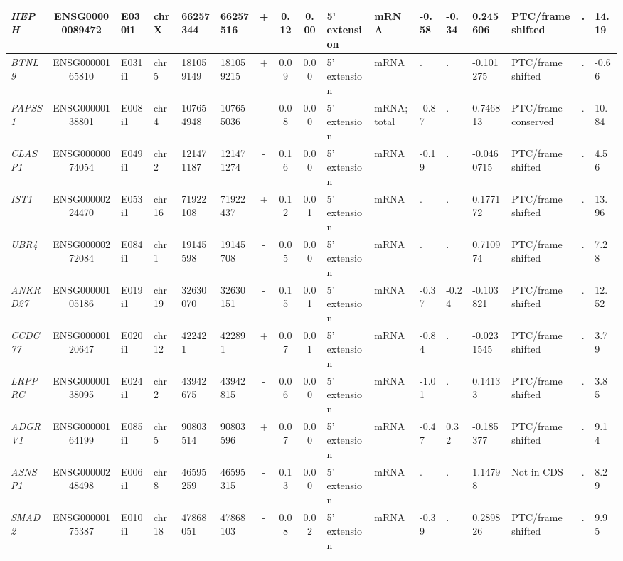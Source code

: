 \begin{appendices}
\begin{landscape}
\begin{table}
{\begin{tabular}{|l|c|l|l|l|l|c|c|c|l|l|l|l|l|l|l|l|}
		\textit{HEPH} & ENSG00000089472 & E030i1 & chrX  & 66257344 & 66257516 & +     & 0.12  & 0.00  & 5' extension & mRNA  & -0.58 & -0.34 & 0.245606 & PTC/frame shifted & . &  14.19 \\ \hline
		\textit{BTNL9} & ENSG00000165810 & E031i1 & chr5  & 181059149 & 181059215 & +     & 0.09  & 0.00  & 5' extension & mRNA  & . & . & -0.101275 & PTC/frame shifted & . &  -0.66 \\ \hline
		\textit{PAPSS1} & ENSG00000138801 & E008i1 & chr4  & 107654948 & 107655036 & -     & 0.08  & 0.00  & 5' extension & mRNA;total & -0.87 & . & 0.746813 & PTC/frame conserved & . &  10.84 \\ \hline
		\textit{CLASP1} & ENSG00000074054 & E049i1 & chr2  & 121471187 & 121471274 & -     & 0.16  & 0.00  & 5' extension & mRNA  & -0.19 & . & -0.0460715 & PTC/frame shifted & . &  4.56 \\ \hline
		\textit{IST1} & ENSG00000224470 & E053i1 & chr16 & 71922108 & 71922437 & +     & 0.12  & 0.01  & 5' extension & mRNA  & . & . & 0.177172 & PTC/frame shifted & . &  13.96 \\ \hline
		\textit{UBR4} & ENSG00000272084& E084i1 & chr1  & 19145598 & 19145708 & -     & 0.05  & 0.00  & 5' extension & mRNA  & . & . & 0.710974 & PTC/frame shifted & . &  7.28 \\ \hline
		\textit{ANKRD27} & ENSG00000105186 & E019i1 & chr19 & 32630070 & 32630151 & -     & 0.15  & 0.01  & 5' extension & mRNA  & -0.37 & -0.24 & -0.103821 & PTC/frame shifted & . &  12.52 \\ \hline
		\textit{CCDC77} & ENSG00000120647 & E020i1 & chr12 & 422421 & 422891 & +     & 0.07  & 0.01  & 5' extension & mRNA  & -0.84 & . & -0.0231545 & PTC/frame shifted & . &  3.79 \\ \hline
		\textit{LRPPRC} & ENSG00000138095 & E024i1 & chr2  & 43942675 & 43942815 & -     & 0.06  & 0.00  & 5' extension & mRNA  & -1.01 & . & 0.14133 & PTC/frame shifted & . &  3.85 \\ \hline
		\textit{ADGRV1} & ENSG00000164199 & E085i1 & chr5  & 90803514 & 90803596 & +     & 0.07  & 0.00  & 5' extension & mRNA  & -0.47 & 0.32  & -0.185377 & PTC/frame shifted & . &  9.14 \\ \hline
		\textit{ASNSP1} & ENSG00000248498 & E006i1 & chr8  & 46595259 & 46595315 & -     & 0.13  & 0.00  & 5' extension & mRNA  & . & . & 1.14798 & Not in CDS     & . &  8.29 \\ \hline
		\textit{SMAD2} & ENSG00000175387 & E010i1 & chr18 & 47868051 & 47868103 & -     & 0.08  & 0.02  & 5' extension & mRNA  & -0.39 & . & 0.289826 & PTC/frame shifted & . &  9.95 \\ \hline

\end{tabular}}
\end{table}
\end{landscape}
\end{appendices}
